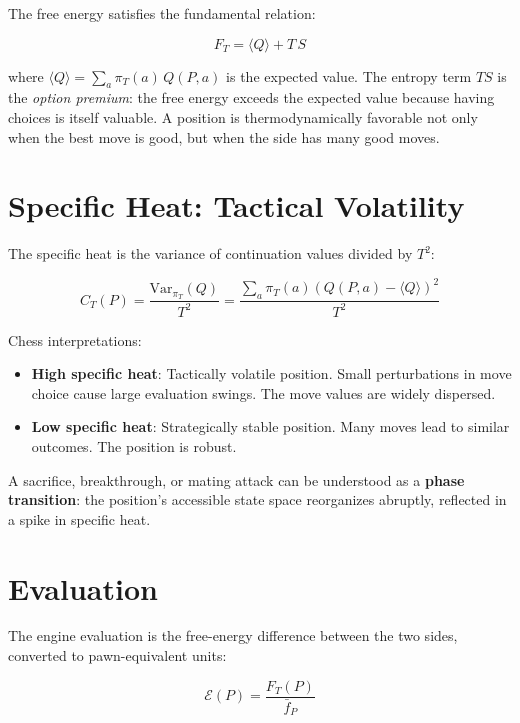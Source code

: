 \documentclass[11pt,a4paper]{article}
\begin{document}
The free energy satisfies the fundamental relation:

\begin{equation}
F_T = \langle Q \rangle + T \, S
\end{equation}

where $\langle Q \rangle = \sum_a \pi_T(a) \, Q(P, a)$ is the expected
value. The entropy term $T S$ is the \emph{option premium}: the free
energy exceeds the expected value because having choices is itself
valuable. A position is thermodynamically favorable not only when the
best move is good, but when the side has many good moves.

\section{Specific Heat: Tactical Volatility}

The specific heat is the variance of continuation values divided by
$T^2$:

\begin{equation}
C_T(P) = \frac{\text{Var}_{\pi_T}(Q)}{T^2} = \frac{\sum_a \pi_T(a)
\left(Q(P,a) - \langle Q \rangle\right)^2}{T^2}
\end{equation}

Chess interpretations:

\begin{itemize}[nosep]
\item \textbf{High specific heat}: Tactically volatile position. Small
  perturbations in move choice cause large evaluation swings. The move
  values are widely dispersed.
\item \textbf{Low specific heat}: Strategically stable position. Many
  moves lead to similar outcomes. The position is robust.
\end{itemize}

A sacrifice, breakthrough, or mating attack can be understood as a
\textbf{phase transition}: the position's accessible state space
reorganizes abruptly, reflected in a spike in specific heat.

\section{Evaluation}

The engine evaluation is the free-energy difference between the two
sides, converted to pawn-equivalent units:

\begin{equation}
\boxed{\mathcal{E}(P) = \frac{F_T(P)}{\bar{f}_P}}
\end{equation}
\end{document}
